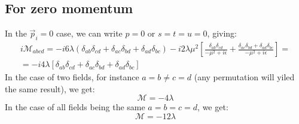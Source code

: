 \documentclass{article}
\begin{document}
\subsection{For zero momentum}
In the $\vec{p}_i = 0$ case, we can write $p = 0$ or $s = t = u = 0$, giving:
\begin{equation}
\begin{gathered}
    i\mathcal{M}_{abcd} = -i6\lambda\left(\delta_{ab}\delta_{cd} + \delta_{ac}\delta_{bd} + \delta_{ad}\delta_{bc}\right) - i2\lambda\mu^2 \left[\frac{\delta_{ab}\delta_{cd}}{- \mu^2 + i\epsilon} + \frac{\delta_{ac}\delta_{bd} + \delta_{ad}\delta_{bc}}{- \mu^2 + i\epsilon}\right] = \\ = -i4\lambda\left[\delta_{ab}\delta_{cd} + \delta_{ac}\delta_{bd} + \delta_{ad}\delta_{bc}\right]
\end{gathered}
\end{equation}
In the case of two fields, for instance $a = b \ne c = d$ (any permutation will yiled the same result), we get:
\begin{equation}
    \mathcal{M} = -4\lambda
\end{equation}
In the case of all fields being the same $a = b = c = d$, we get:
\begin{equation}
    \mathcal{M} = -12\lambda
\end{equation}
\end{document}
